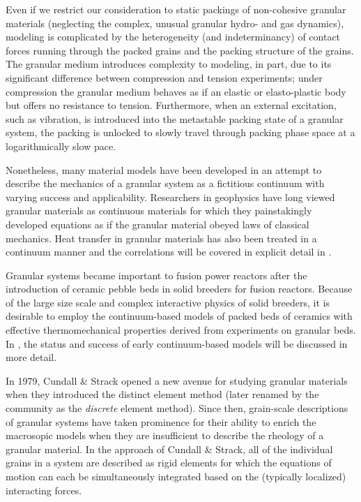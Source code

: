 Even if we restrict our consideration to static packings of non-cohesive granular materials (neglecting the complex, unusual granular hydro- and gas dynamics), modeling is complicated by the heterogeneity (and indeterminancy) of contact forces running through the packed grains and the packing structure of the grains. The granular medium introduces complexity to modeling, in part, due to its significant difference between compression and tension experiments; under compression the granular medium behaves as if an elastic or elasto-plastic body but offers no resistance to tension. Furthermore, when an external excitation, such as vibration, is introduced into the metastable packing state of a granular system, the packing is unlocked to slowly travel through packing phase space at a logarithmically slow pace.\cite{Barker1993,Knight1995}

Nonetheless, many material models have been developed in an attempt to describe the mechanics of a granular system as a fictitious continuum with varying success and applicability. Researchers in geophysics have long viewed granular materials as continuous materials for which they painstakingly developed equations as if the granular material obeyed laws of classical mechanics.\cite{duran2012sands,drucker0000soil_2,Hill} Heat transfer in granular materials has also been treated in a continuum manner and the correlations will be covered in explicit detail in . 

Granular systems became important to fusion power reactors after the introduction of ceramic pebble beds in solid breeders for fusion reactors. Because of the large size scale and complex interactive physics of solid breeders, it is desirable to employ the continuum-based models of packed beds of ceramics with effective thermomechanical properties derived from experiments on granular beds. In , the status and success of early continuum-based models will be discussed in more detail.

In 1979, Cundall \& Strack opened a new avenue for studying granular materials when they introduced the distinct element method (later renamed by the community as the \textit{discrete} element method).\cite{Cundall1979} Since then, grain-scale descriptions of granular systems have taken prominence for their ability to enrich the macrosopic models when they are insufficient to describe the rheology of a granular material. In the approach of Cundall \& Strack, all of the individual grains in a system are described as rigid elements for which the equations of motion can each be simultaneously integrated based on the (typically localized) interacting forces.


